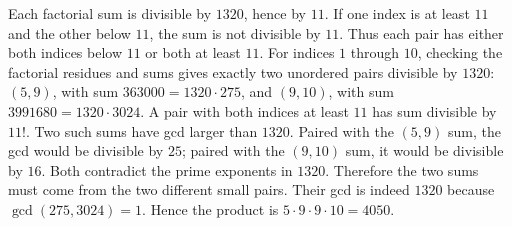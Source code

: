 Each factorial sum is divisible by $1320$, hence by $11$. If one index is at least $11$ and the other below $11$, the sum is not divisible by $11$. Thus each pair has either both indices below $11$ or both at least $11$. For indices $1$ through $10$, checking the factorial residues and sums gives exactly two unordered pairs divisible by $1320$: $(5,9)$, with sum $363000=1320\cdot275$, and $(9,10)$, with sum $3991680=1320\cdot3024$. A pair with both indices at least $11$ has sum divisible by $11!$. Two such sums have gcd larger than $1320$. Paired with the $(5,9)$ sum, the gcd would be divisible by $25$; paired with the $(9,10)$ sum, it would be divisible by $16$. Both contradict the prime exponents in $1320$. Therefore the two sums must come from the two different small pairs. Their gcd is indeed $1320$ because $\gcd(275,3024)=1$. Hence the product is $5\cdot9\cdot9\cdot10=\boxed{4050}$.
